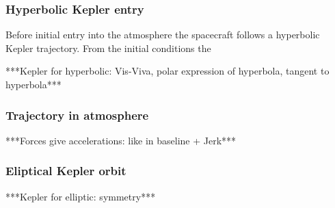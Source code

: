 \subsubsection{Hyperbolic Kepler entry}
 \label{sec:hypkep}
Before initial entry into the atmosphere the spacecraft follows a hyperbolic Kepler trajectory. From the initial conditions the 

***Kepler for hyperbolic: Vis-Viva, polar expression of hyperbola, tangent to hyperbola***\\

\subsubsection{Trajectory in atmosphere}
 \label{sec:trajatmos}
***Forces give accelerations: like in baseline + Jerk***\\

\subsubsection{Eliptical Kepler orbit}
 \label{sec:eliptickep}
***Kepler for elliptic: symmetry***\\



